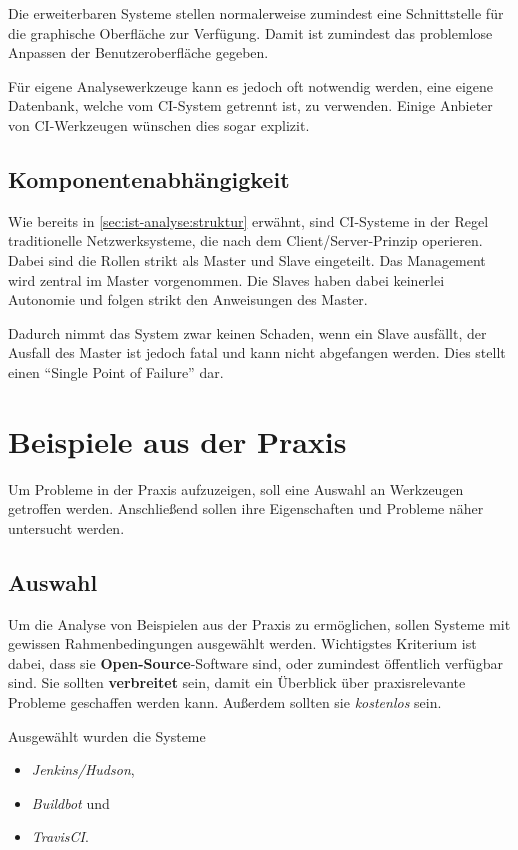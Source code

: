 Die erweiterbaren Systeme stellen normalerweise zumindest eine Schnittstelle
für die graphische Oberfläche zur Verfügung.
Damit ist zumindest das problemlose Anpassen der Benutzeroberfläche gegeben.


Für eigene Analysewerkzeuge kann es jedoch oft notwendig werden,
eine eigene Datenbank, welche vom \ac{CI}-System getrennt ist, zu verwenden.
Einige Anbieter von \ac{CI}-Werkzeugen wünschen dies sogar explizit.


\subsection{Komponentenabhängigkeit}

Wie bereits in \cref{sec:ist-analyse:struktur} erw\"ahnt,
sind \ac{CI}-Systeme in der Regel traditionelle Netzwerksysteme,
die nach dem Client/Server-Prinzip operieren.
Dabei sind die Rollen strikt als Master und Slave eingeteilt.
Das Management wird zentral im Master vorgenommen.
Die Slaves haben dabei keinerlei Autonomie
und folgen strikt den Anweisungen des Master.

Dadurch nimmt das System zwar keinen Schaden, wenn ein Slave ausfällt,
der Ausfall des Master ist jedoch fatal und kann nicht abgefangen werden.
Dies stellt einen ``Single Point of Failure'' dar.


\section{Beispiele aus der Praxis}

Um Probleme in der Praxis aufzuzeigen,
soll eine Auswahl an Werkzeugen getroffen werden.
Anschließend sollen ihre Eigenschaften und Probleme
näher untersucht werden.


\subsection{Auswahl}

Um die Analyse von Beispielen aus der Praxis zu ermöglichen,
sollen Systeme mit gewissen Rahmenbedingungen ausgew\"ahlt werden.
Wichtigstes Kriterium ist dabei, dass sie \textbf{Open-Source}-Software sind,
oder zumindest öffentlich verfügbar sind.
Sie sollten \textbf{verbreitet} sein, damit ein Überblick
über praxisrelevante Probleme geschaffen werden kann.
Außerdem sollten sie \textit{kostenlos} sein. %

Ausgewählt wurden die Systeme
\begin{itemize}
  \item \emph{Jenkins/Hudson},
  \item \emph{Buildbot} und
  \item \emph{TravisCI}.
\end{itemize}

